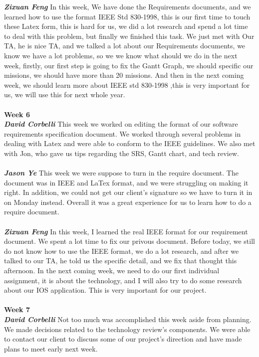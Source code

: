 \documentclass[onecolumn, draftclsnofoot,10pt, compsoc]{IEEEtran}
\begin{document}
\textbf{\textit{Zixuan Feng}}
In this week, We have done the Requirements documents, and we learned how to use the format IEEE Std 830-1998, this is our first time to touch these Latex form, this is hard for us, we did a lot research and spend a lot time to deal with this problem, but finally we finished this task. We just met with Our TA, he is nice TA, and we talked a lot about our Requirements documents, we know we have a lot problems, so we we know what should we do in the next week, firstly, our first step is going to fix the Gantt Graph, we should specific our missions, we should have more than 20 missions. And then in the next coming week, we should learn more about IEEE std 830-1998 ,this is very important for us, we will use this for next whole year.\\ \\
\textbf{Week 6}
\\ \textbf{\textit{David Corbelli}}
This week we worked on editing the format of our software requirements specification document. We worked through several problems in dealing with Latex and were able to conform to the IEEE guidelines. We also met with Jon, who gave us tips regarding the SRS, Gantt chart, and tech review.\\ \\
\textbf{\textit{Jason Ye}}
This week we were suppose to turn in the require document. The document was in IEEE and LaTex format, and we were struggling on making it right. In addition, we could not get our client's signature so we have to turn it in on Monday instead. Overall it was a great experience for us to learn how to do a require document. \\ \\
\textbf{\textit{Zixuan Feng}}
In this week, I learned the real IEEE format for our requirement document. We spent a lot time to fix our privous document. Before today, we still do not know how to use the IEEE format, we do a lot research, and after we talked to our TA, he told us the specific detail, and we fix that thought this afternoon. In the next coming week, we need to do our first individual assignment, it is about the technology, and I will also try to do some research about our IOS application. This is very important for our project.\\ \\
\textbf{Week 7}
\\ \textbf{\textit{David Corbelli}}
Not too much was accomplished this week aside from planning. We made decisions related to the technology review's components. We were able to contact our client to discuss some of our project's direction and have made plans to meet early next week.\\ \\
\end{document}
